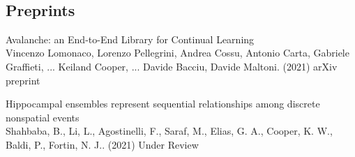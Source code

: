 \documentclass[10pt]{cooperCV2}
\begin{document}

\needspace{\headerpush}
\myRule{\columnwidth}{1pt}\\

 
 
	

\subsection{Preprints} 
\begin{etaremune}[itemindent=-1.5\bibhang, topsep=0pt,
				   itemsep=\bibsep,partopsep=0pt,parsep=0pt,leftmargin={\bibhang+\widthof{[999]}}] 
    
    \item Avalanche: an End-to-End Library for Continual Learning \\
     Vincenzo Lomonaco, Lorenzo Pellegrini, Andrea Cossu, Antonio Carta, Gabriele Graffieti, ... Keiland Cooper, ... Davide Bacciu, Davide Maltoni. (2021) arXiv preprint 
     
	
    \item Hippocampal ensembles represent sequential relationships among discrete nonspatial events \\
     Shahbaba, B., Li, L., Agostinelli, F., Saraf, M., Elias, G. A., Cooper, K. W., Baldi, P.,  Fortin, N. J.. (2021) Under Review 
     
	

\end{etaremune}

 

	
\end{document}
